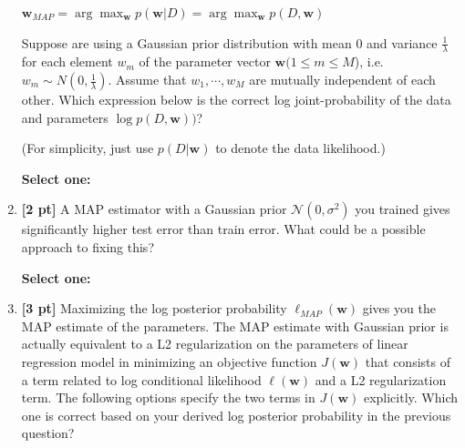 \documentclass{article}
\newcommand{\blackcircle}{\tikz\draw[black,fill=black] (0,0) circle (1ex);}
\renewcommand{\circle}{\tikz\draw[black] (0,0) circle (1ex);}
\begin{document}
\begin{enumerate}
    $\mathbf{w}_{MAP} = \arg\max_{\mathbf{w}} p(\mathbf{w} | D) = \arg\max_{\mathbf{w}} p(D, \mathbf{w})$

    Suppose are using a Gaussian prior distribution with mean 0 and variance $\frac{1}{\lambda}$ for each element $w_m$  of the parameter vector $\mathbf{w} (1 \leq m \leq M $), i.e. $w_m \sim N(0, \frac{1}{\lambda})$. Assume that $w_1, \cdots, w_M$ are mutually independent of each other. Which expression below is the correct log joint-probability of the data and parameters $\log p(D, \mathbf{w}))$? 

    (For simplicity, just use $p(D|\mathbf{w})$ to denote the data likelihood.)

    \textbf{Select one:}
    
    \item \textbf{[2 pt]} A MAP estimator with a Gaussian prior $\mathcal{N}(0, \sigma^2)$ you trained gives significantly higher test error than train error. What could be a possible approach to fixing this? 

    \textbf{Select one:}
    
    \item \textbf{[3 pt]} Maximizing the log posterior probability  $\ell_{\textit{MAP}}(\mathbf{w})$ gives you the MAP estimate of the parameters. The MAP estimate with Gaussian prior is actually equivalent to a L2 regularization on the parameters of linear regression model in minimizing an objective function $J(\mathbf{w})$ that consists of a term related to log conditional likelihood $\ell(\mathbf{w})$ and a L2 regularization term. The following options specify the two terms in $J(\mathbf{w})$ explicitly. Which one is correct based on your derived log posterior probability in the previous question? 


\end{enumerate}
\end{document}

